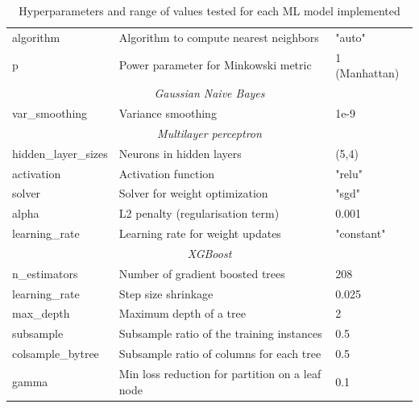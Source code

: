 \begin{table}[h]
\begin{adjustbox}{center}
\begin{tabular}{|l|l|l|}
			algorithm & Algorithm to compute nearest neighbors & "auto" \\
			p & Power parameter for Minkowski metric & 1 (Manhattan) \\
			\hline
			\multicolumn{3}{|c|}{\rule{0pt}{2.5ex}\textit{Gaussian Naive Bayes}} \\
			\hline
			var\_smoothing & Variance smoothing & 1e-9 \\
			\hline
			\multicolumn{3}{|c|}{\rule{0pt}{2.5ex}\textit{Multilayer perceptron}} \\
			\hline
			hidden\_layer\_sizes & Neurons in hidden layers & (5,4) \\
			activation & Activation function & "relu" \\
			solver & Solver for weight optimization & "sgd" \\
			alpha & L2 penalty (regularisation term) & 0.001 \\
			learning\_rate & Learning rate for weight updates & "constant" \\
			\hline
			\multicolumn{3}{|c|}{\rule{0pt}{2.5ex}\textit{XGBoost}} \\
			\hline
			n\_estimators & Number of gradient boosted trees & 208 \\
			learning\_rate & Step size shrinkage & 0.025 \\
			max\_depth & Maximum depth of a tree & 2 \\
			subsample & Subsample ratio of the training instances & 0.5 \\
			colsample\_bytree & Subsample ratio of columns for each tree & 0.5 \\
			gamma & Min loss reduction for partition on a leaf node & 0.1 \\
			\hline
		\end{tabular}
	\end{adjustbox}
	
	\caption{Hyperparameters and range of values tested for each ML model implemented}
	\label{table:hyperparameters2}
\end{table}


